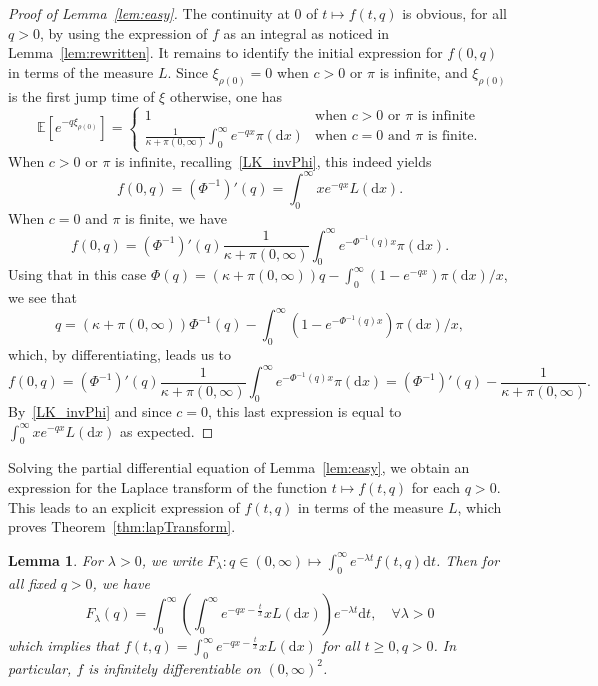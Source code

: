 \documentclass[10pt]{amsart}
\newtheorem{lemm}[theo]{Lemma}
\theoremstyle{definition}
\numberwithin{equation}{section}
\newcommand{\bbE}{\mathbb{E}}
\newcommand{\dd}{\mathrm{d}}
\let\oldforall\forall
\renewcommand*{\forall}{\mathrel{\oldforall}}
\begin{document}
\begin{proof}[Proof of Lemma~\ref{lem:easy}]
The continuity at 0 of $t \mapsto f(t,q)$ is obvious, for all $q>0$, by using the expression of $f$ as an integral as noticed in Lemma~\ref{lem:rewritten}. It remains to identify the initial expression for $f(0,q)$ in terms of the measure $L$. Since $\xi_{\rho(0)}=0$ when $c>0$ or $\pi$ is infinite, and $\xi_{\rho(0)}$ is the first jump time of $\xi$ otherwise, one has
\[
\bbE\left[e^{-q \xi_{\rho(0)}}\right]=\left\{
\begin{array}{ll} 1 & \text{when $c>0$ or $\pi$ is infinite}\\ \frac{1}{\kappa+\pi(0,\infty)}\int_0^{\infty}e^{-qx} \pi(\dd x) & \text{when $c=0$ and $\pi$ is finite.}
\end{array}\right.
\]
When $c>0$ or $\pi$ is infinite, recalling~\eqref{LK_invPhi}, this indeed yields
\[
f(0,q)=(\Phi^{-1})'(q)=\int_0^{\infty} xe^{-qx} L(\dd x).
\]
When $c=0$ and $\pi$ is finite, we have
\[
f(0,q)=(\Phi^{-1})'(q) \frac{1}{\kappa+\pi(0,\infty)}\int_0^{\infty}e^{-\Phi^{-1}(q)x} \pi(\dd x).
\]
Using that in this case $\Phi(q)=(\kappa+\pi(0,\infty))q-\int_0^{\infty}(1-e^{-qx})\pi(\dd x)/x$, we see that
\[
q=(\kappa+\pi(0,\infty))\Phi^{-1}(q)-\int_0^{\infty}\left(1-e^{-\Phi^{-1}(q)x}\right)\pi(\dd x)/x,
\]
which, by differentiating, leads us to
\[
f(0,q)=(\Phi^{-1})'(q) \frac{1}{\kappa+\pi(0,\infty)}\int_0^{\infty}e^{-\Phi^{-1}(q)x} \pi(\dd x)=(\Phi^{-1})'(q) -\frac{1}{\kappa+\pi(0,\infty)}.
\]
By~\eqref{LK_invPhi} and since $c=0$, this last expression is equal to $\int_0^{\infty} xe^{-qx} L(\dd x)$ as expected.
\end{proof}


Solving the partial differential equation of Lemma~\ref{lem:easy}, we obtain an expression for the Laplace transform of the function $t \mapsto f(t,q)$ for each $q > 0$. This leads to an explicit expression of $f(t,q)$ in terms of the measure $L$, which proves Theorem~\ref{thm:lapTransform}.

\begin{lemm}\label{lem:laplaceLaplace}
For $\lambda>0$, we write $F_{\lambda} : q \in (0,\infty)\mapsto \int_0^{\infty} e^{-\lambda t} f(t,q) \dd t$. Then for all fixed $q>0$, we have
\begin{equation}\label{eq:Laplace}
F_{\lambda}(q)=\int_0^{\infty} \left(\int_0^{\infty} e^{-qx -\frac{t}{x}} xL(\dd x)\right) e^{-\lambda t} \dd t, \quad \forall \lambda>0
\end{equation}
which implies that $f(t,q)= \int_0^{\infty} e^{-qx -\frac{t}{x}} xL(\dd x)$ for all $t \geq 0, q>0$. In particular, $f$ is infinitely differentiable on $(0,\infty)^2$.
\end{lemm}
\end{document}
